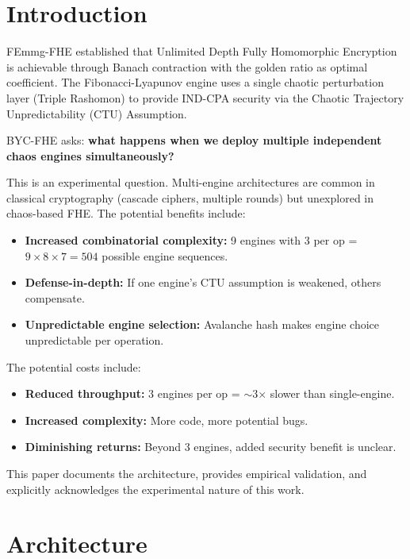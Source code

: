 \documentclass[11pt,a4paper]{article}
\begin{document}
\section{Introduction}

FEmmg-FHE established that Unlimited Depth Fully Homomorphic Encryption is achievable through Banach contraction with the golden ratio as optimal coefficient. The Fibonacci-Lyapunov engine uses a single chaotic perturbation layer (Triple Rashomon) to provide IND-CPA security via the Chaotic Trajectory Unpredictability (CTU) Assumption.

BYC-FHE asks: \textbf{what happens when we deploy multiple independent chaos engines simultaneously?}

This is an experimental question. Multi-engine architectures are common in classical cryptography (cascade ciphers, multiple rounds) but unexplored in chaos-based FHE. The potential benefits include:

\begin{itemize}
\item \textbf{Increased combinatorial complexity:} 9 engines with 3 per op = $9 \times 8 \times 7 = 504$ possible engine sequences.
\item \textbf{Defense-in-depth:} If one engine's CTU assumption is weakened, others compensate.
\item \textbf{Unpredictable engine selection:} Avalanche hash makes engine choice unpredictable per operation.
\end{itemize}

The potential costs include:

\begin{itemize}
\item \textbf{Reduced throughput:} 3 engines per op = $\sim$3$\times$ slower than single-engine.
\item \textbf{Increased complexity:} More code, more potential bugs.
\item \textbf{Diminishing returns:} Beyond 3 engines, added security benefit is unclear.
\end{itemize}

This paper documents the architecture, provides empirical validation, and explicitly acknowledges the experimental nature of this work.

\section{Architecture}
\end{document}

